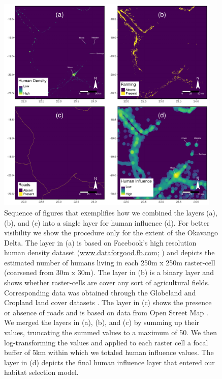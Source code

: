 \documentclass[abstract=off,10pt,a4paper,bibliography=totocnumbered]{article}
\begin{document}
\begin{figure}[hbtp]
  \begin{center}
    \includegraphics[width = 0.95\textwidth]{99_HumanInfluence.pdf}
    \caption{Sequence of figures that exemplifies how we combined the layers
    (a), (b), and (c) into a single layer for human influence (d). For better
    visibility we show the procedure only for the extent of the Okavango Delta.
    The layer in (a) is based on Facebook's high resolution human density
    dataset (\url{www.dataforgood.fb.com}; \citealp{Facebook.2019}) and depicts
    the estimated number of humans living in each 250m x 250m raster-cell
    (coarsened from 30m x 30m). The layer in (b) is a binary layer and shows
    whether raster-cells are cover any sort of agricultural fields.
    Corresponding data was obtained through the Globeland and Cropland land
    cover datasets \citep{Chen.2015, Xiong.2017}. The layer in (c) shows the
    presence or absence of roads and is based on data from Open Street Map
    \citep{OpenStreetMap.2019}. We merged the layers in (a), (b), and (c) by
    summing up their values, truncating the summed values to a maximum of 50. We
    then log-transforming the values and applied to each raster cell a focal
    buffer of 5km within which we totaled human influence values. The layer in
    (d) depicts the final human influence layer that entered our habitat
    selection model.}
    \label{HumanInfluence}
  \end{center}
\end{figure}
\end{document}
